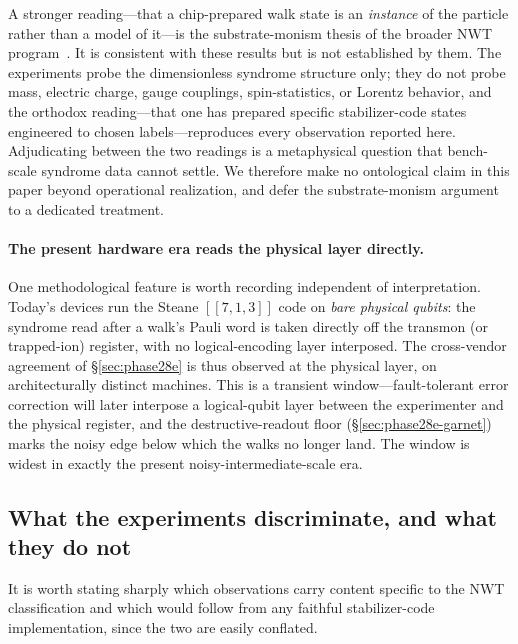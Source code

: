 \documentclass[11pt]{article}
\newcommand{\Klogical}{[[7, 1, 3]]}
\begin{document}
A stronger reading---that a chip-prepared walk state is an \emph{instance} of the particle rather than a model of it---is the substrate-monism thesis of the broader NWT program~\cite{Paper19}.  It is consistent with these results but is not established by them.  The experiments probe the dimensionless syndrome structure only; they do not probe mass, electric charge, gauge couplings, spin-statistics, or Lorentz behavior, and the orthodox reading---that one has prepared specific stabilizer-code states engineered to chosen labels---reproduces every observation reported here.  Adjudicating between the two readings is a metaphysical question that bench-scale syndrome data cannot settle.  We therefore make no ontological claim in this paper beyond operational realization, and defer the substrate-monism argument to a dedicated treatment.

\paragraph{The present hardware era reads the physical layer directly.}
One methodological feature is worth recording independent of interpretation.  Today's devices run the Steane $\Klogical$ code on \emph{bare physical qubits}: the syndrome read after a walk's Pauli word is taken directly off the transmon (or trapped-ion) register, with no logical-encoding layer interposed.  The cross-vendor agreement of \S\ref{sec:phase28e} is thus observed at the physical layer, on architecturally distinct machines.  This is a transient window---fault-tolerant error correction will later interpose a logical-qubit layer between the experimenter and the physical register, and the destructive-readout floor (\S\ref{sec:phase28e-garnet}) marks the noisy edge below which the walks no longer land.  The window is widest in exactly the present noisy-intermediate-scale era.

\subsection{What the experiments discriminate, and what they do not}
\label{sec:discriminating-content}

It is worth stating sharply which observations carry content specific to the NWT classification and which would follow from any faithful stabilizer-code implementation, since the two are easily conflated.
\end{document}
